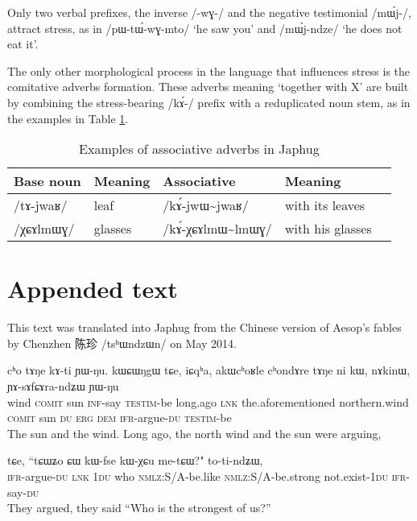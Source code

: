 \documentclass[oneside,a4paper,11pt]{article}
\newcommand{\ipa}[1]{\mbox{\phon/#1/}}
\newcommand{\ipab}[1]{{\phon#1}}
\newcommand{\zh}[1]{{\cn #1}}
\newcommand{\tld}{\textasciitilde{}}
\begin{document}
Only two verbal prefixes, the inverse \ipa{-wɣ-} and the negative testimonial \ipa{mɯ́j-}, attract stress, as in \ipa{pɯ-tɯ́-wɣ-mto} `he saw you' and \ipa{mɯ́j-ndze} `he does not eat it'.
    
The only other morphological process in the language that influences stress is the comitative adverbs formation. These adverbs meaning `together with X' are built by combining the stress-bearing \ipa{kɤ́-}  prefix with a reduplicated noun stem, as in the examples in Table \ref{tab:assoc.adv}.

\begin{table}
 \caption{Examples of associative adverbs in Japhug} \label{tab:assoc.adv}  \centering
\begin{tabular}{lllll}
\toprule
Base noun & Meaning & Associative & Meaning \\
\midrule
\ipa{tɤ-jwaʁ} & leaf & \ipa{kɤ́-jwɯ\tld{}jwaʁ} & with its leaves\\
\ipa{χɕɤlmɯɣ} & glasses & \ipa{kɤ́-χɕɤlmɯ\tld{}lmɯɣ} & with his glasses\\
\bottomrule
\end{tabular}
\end{table}
    
    
     \section*{Appended text}
     
   This text was translated into Japhug from the Chinese version of Aesop's fables by Chenzhen \zh{陈珍} \ipa{tsʰɯndzɯn} on May 2014. 
   
     \begin{exe} 
 \ex 
\gll  \ipab{qale} \ipab{cʰo} \ipab{tɤŋe} \ipab{kɤ-ti} \ipab{ɲɯ-ŋu.} \ipab{kɯɕɯŋgɯ} \ipab{tɕe,} \ipab{iɕqʰa,} \ipab{akɯcʰoʁle}   \ipab{cʰondɤre} \ipab{tɤŋe} \ipab{ni} \ipab{kɯ,} \ipab{nɤkinɯ,} \ipab{ɲɤ-sɤfɕɤra-ndʑɯ} \ipab{ɲɯ-ŋu} \\ 
 wind \textsc{comit} sun    \textsc{inf}-say \textsc{testim}-be   long.ago     \textsc{lnk}  the.aforementioned northern.wind  \textsc{comit}     sun    \textsc{du}  \textsc{erg} \textsc{dem} \textsc{ifr}-argue-\textsc{du}    \textsc{testim}-be\\ 
 \glt  The sun and the wind. Long ago, the north wind and the sun were arguing,
\end{exe} 

 

\begin{exe} 
 \ex 
\gll  \ipab{ɲɤ-sɤfɕɤra-ndʑɯ} \ipab{tɕe,} \ipab{``tɕɯʑo} \ipab{ɕɯ} \ipab{kɯ-fse} \ipab{kɯ-χɕu} \ipab{me-tɕɯ?"} \ipab{to-ti-ndʑɯ,} \\ 
 \textsc{ifr}-argue-\textsc{du}    \textsc{lnk}  1\textsc{du}     who \textsc{nmlz}:S/A-be.like \textsc{nmlz}:S/A-be.strong not.exist-1\textsc{du}  \textsc{ifr}-say-\textsc{du}\\ 
 \glt  They argued, they said ``Who is the strongest of us?''
\end{exe} 
\end{document}
